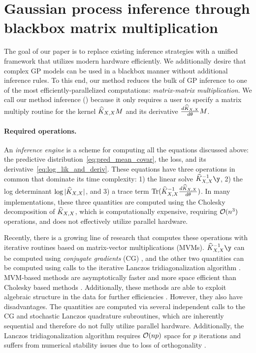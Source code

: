 \section{Gaussian process inference through blackbox matrix multiplication}

\label{sec:method}
The goal of our paper is to replace existing inference strategies with a unified framework that utilizes modern hardware efficiently.
We additionally desire that complex GP models can be used in a blackbox manner without additional inference rules. To this end,
our method reduces the bulk of GP inference to one of the most efficiently-parallelized computations: \emph{matrix-matrix multiplication}.
We call our method \mmfullname{} inference (\mmacro) because it only requires a user to specify a matrix multiply routine for the kernel $\widehat{K}_{X,X} M$ and its derivative $\frac{d\widehat{K}_{X,X}}{d\theta}M$.

\paragraph{Required operations.}
An \emph{inference engine} is a scheme for computing all the equations discussed above: the predictive distribution~\eqref{eq:pred_mean_covar}, the loss, and its derivative~\eqref{eq:log_lik_and_deriv}.
These equations have three operations in common that dominate its time complexity:
1) the linear solve $\trainK^{-1}\y$,
2) the log determinant $\log \vert \widehat{K}_{X,X} \vert$,
and 3) a trace term $\tr{\trainK^{-1}\frac{d\trainK}{d\theta}}$.
In many implementations, these three quantities are computed using the Cholesky decomposition of $\widehat{K}_{X,X}$,
which is computationally expensive, requiring $\bigo{n^3}$ operations, and does not effectively utilize parallel hardware.

Recently, there is a growing line of research that computes these operations with iterative routines based on matrix-vector multiplications (MVMs).
$\trainK^{-1}\y$ can be computed using \emph{conjugate gradients} (CG) \cite{cunningham2008fast,cutajar2016preconditioning,saatcci2012scalable,wilson2015kernel},
and the other two quantities can be computed using calls to the iterative Lanczos tridiagonalization algorithm \cite{ubaru2017fast,dong2017scalable}.
MVM-based methods are asymptotically faster and more space efficient than Cholesky based methods \cite{wilson2015kernel,dong2017scalable}.
Additionally, these methods are able to exploit algebraic structure in the data for further efficiencies \cite{cunningham2008fast,saatcci2012scalable,wilson2015kernel}.
However, they also have disadvantages.
The quantities are computed via several independent calls to the CG and stochastic Lanczos quadrature subroutines, which are inherently sequential and therefore do not fully utilize parallel hardware. Additionally, the Lanczos tridiagonalization algorithm requires $\bigo{np}$ space for $p$ iterations and suffers from numerical stability issues due to loss of orthogonality \cite{golub2012matrix}.

